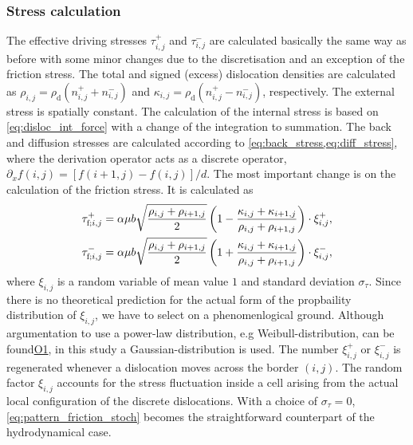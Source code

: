 \subsubsection{Stress calculation}
The effective driving stresses $\tau _{i,j}^ + $ and $\tau _{i,j}^ - $ are calculated basically the same way as before with some minor changes due to the discretisation and an exception of the friction stress. The total and signed (excess) dislocation densities are calculated as ${\rho _{i,j}} = {\rho _{\text{d}}}\left( {n_{i,j}^ +  + n_{i,j}^ - } \right)$ and ${\kappa _{i,j}} = {\rho _{\text{d}}}\left( {n_{i,j}^ +  - n_{i,j}^ - } \right)$, respectively. The external stress is spatially constant. The calculation of the internal stress is based on \cref{eq:disloc_int_force} with a change of the integration to summation. The back and diffusion stresses are calculated according to \cref{eq:back_stress,eq:diff_stress}, where the derivation operator acts as a discrete operator, ${\partial _x}f\left( {i,j} \right) = \left[ {f\left( {i + 1,j} \right) - f\left( {i,j} \right)} \right]/d$. The most important change is on the calculation of the friction stress. It is calculated as
\begin{equation}\label{eq:pattern_friction_stoch}
\begin{aligned}
\tau _{{\rm{f;}}i,j}^ +  = \alpha \mu b\sqrt {\frac{{{\rho _{i,j}} + {\rho _{i + 1,j}}}}{2}} \left( {1 - \frac{{{\kappa _{i,j}} + {\kappa _{i + 1,j}}}}{{{\rho _{i,j}} + {\rho _{i + 1,j}}}}} \right) \cdot \xi _{i,j}^ + ,\\
\tau _{{\rm{f;}}i,j}^ -  = \alpha \mu b\sqrt {\frac{{{\rho _{i,j}} + {\rho _{i + 1,j}}}}{2}} \left( {1 + \frac{{{\kappa _{i,j}} + {\kappa _{i + 1,j}}}}{{{\rho _{i,j}} + {\rho _{i + 1,j}}}}} \right) \cdot \xi _{i,j}^ - ,
\end{aligned}
\end{equation}
where ${\xi _{i,j}}$ is a random variable of mean value $1$ and standard deviation ${\sigma _\tau }$. Since there is no theoretical prediction for the actual form of the propbaility distribution of $\xi_{i,j}$, we have to select on a phenomenlogical ground. Although argumentation to use a power-law distribution, e.g Weibull-distribution, can be found\hyperref[paper:A2]{O1}, in this study a Gaussian-distribution is used. The number $\xi _{i,j}^ + $ or $\xi _{i,j}^ - $ is regenerated whenever a dislocation moves across the border $\left( {i,j} \right)$. The random factor $\xi_{i,j}$ accounts for the stress fluctuation inside a cell arising from the actual local configuration of the discrete dislocations\cite{1742-5468-2005-08-P08004}. With a choice of ${\sigma _\tau } = 0$, \cref{eq:pattern_friction_stoch} becomes the straightforward counterpart of the hydrodynamical case.

